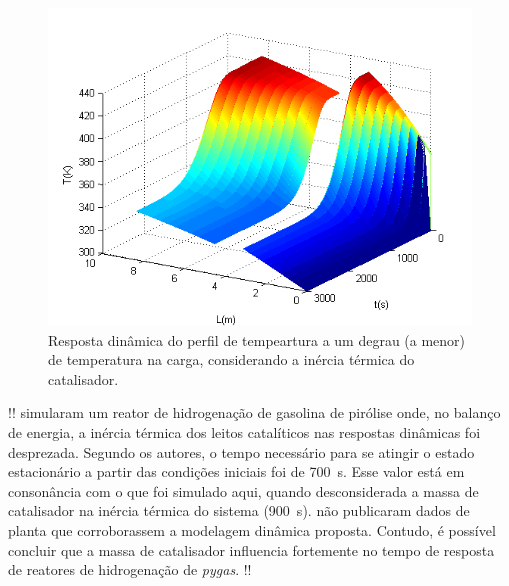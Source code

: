 \begin{figure}[htb]
\centering
\includegraphics[scale=0.8]{images/Chap4/Feed_T_300K_catalyst_influence.png}
\caption{Resposta dinâmica do perfil de tempeartura a um degrau (a menor) de
temperatura na carga, considerando a inércia térmica do catalisador.}
\label{fig:Feed_T_300K_catalyst_influence}
\end{figure}

!!  simularam um reator de hidrogenação de
gasolina de pirólise onde, no balanço de energia, a inércia térmica dos leitos
catalíticos nas respostas dinâmicas foi desprezada. Segundo os autores, o tempo
necessário para se atingir o estado estacionário a partir das condições
iniciais foi de \SI{700}{s}. Esse valor está em consonância com o que foi
simulado aqui, quando desconsiderada a massa de catalisador na inércia térmica
do sistema (\SI{900}{s}).  não publicaram dados
de planta que corroborassem a modelagem dinâmica proposta. Contudo, é possível
concluir que a massa de catalisador influencia fortemente no tempo de resposta
de reatores de hidrogenação de \emph{pygas}. !!

% 

